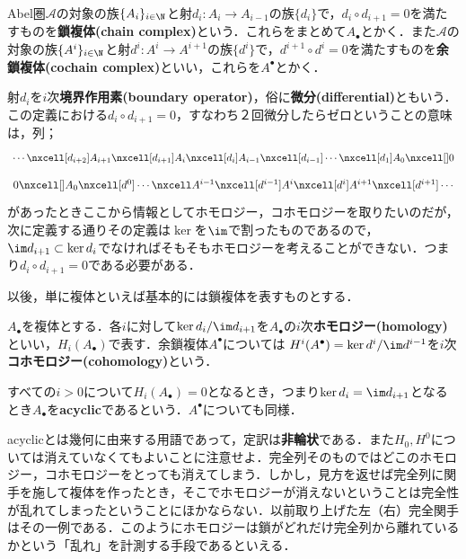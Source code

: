 \begin{defi}[複体]
	Abel圏$\mathscr{A}$の対象の族$\{A_i\}_{i\in\N}$と射$d_i:A_{i}\to A_{i-1}$の族$\{d_i\}$で，$d_{i}\circ d_{i+1}=0$を満たすものを\textbf{鎖複体(chain complex)}という．これらをまとめて$A_\bullet$とかく．また$\mathscr{A}$の対象の族$\{A^i\}_{i\in\N}$と射$d^i:A^i\to A^{i+1}$の族$\{d^i\}$で，$d^{i+1}\circ d^{i}=0$を満たすものを\textbf{余鎖複体(cochain complex)}といい，これらを$A^\bullet$とかく．
\end{defi}

射$d_i$を$i$次\textbf{境界作用素(boundary operator)}，俗に\textbf{微分(differential)}ともいう．この定義における$d_i\circ d_{i+1}=0$，すなわち２回微分したらゼロということの意味は，列；
\[\begin{tikzcd}
\cdots\nxcell[d_{i+2}]A_{i+1}\nxcell[d_{i+1}]A_i\nxcell[d_i]A_{i-1}\nxcell[d_{i-1}]\cdots\nxcell[d_1] A_0\nxcell[]0
\end{tikzcd}\]
\[\begin{tikzcd}
0\nxcell[]A_0\nxcell[d^0]\cdots\nxcell A^{i-1}\nxcell[d^{i-1}]A^i\nxcell[d^i]A^{i+1}\nxcell[d^{i+1}]\cdots
\end{tikzcd}\]
があったときここから情報としてホモロジー，コホモロジーを取りたいのだが，次に定義する通りその定義は$\ker$を$\im$で割ったものであるので，$\im d_{i+1}\subset\ker d_i$でなければそもそもホモロジーを考えることができない．つまり$d_i\circ d_{i+1}=0$である必要がある．

以後，単に複体といえば基本的には鎖複体を表すものとする．
\begin{defi}
	$A_\bullet$を複体とする．各$i$に対して$\ker d_i/\im d_{i+1}$を$A_\bullet$の$i$次\textbf{ホモロジー(homology)}といい，$H_i(A_\bullet)$で表す．余鎖複体$A^\bullet$については $H^i(A^\bullet)=\ker d^i/\im d^{i-1}$を$i$次\textbf{コホモロジー(cohomology)}という．
\end{defi}

\begin{defi}
	すべての$i>0$について$H_i(A_\bullet)=0$となるとき，つまり$\ker d_i=\im d_{i+1}$となるとき$A_\bullet$を\textbf{acyclic}であるという．$A^\bullet$についても同様．
\end{defi}

acyclicとは幾何に由来する用語であって，定訳は\textbf{非輪状}である．また$H_0, H^0$については消えていなくてもよいことに注意せよ．完全列そのものではどこのホモロジー，コホモロジーをとっても消えてしまう．しかし，見方を返せば完全列に関手を施して複体を作ったとき，そこでホモロジーが消えないということは完全性が乱れてしまったということにほかならない．以前取り上げた左（右）完全関手はその一例である．このようにホモロジーは鎖がどれだけ完全列から離れているかという「乱れ」を計測する手段であるといえる．

